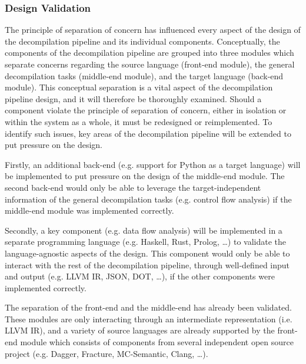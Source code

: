 
\subsubsection{Design Validation}
\label{sec:con_design_validation}

The principle of separation of concern has influenced every aspect of the design of the decompilation pipeline and its individual components. Conceptually, the components of the decompilation pipeline are grouped into three modules which separate concerns regarding the source language (front-end module), the general decompilation tasks (middle-end module), and the target language (back-end module). This conceptual separation is a vital aspect of the decompilation pipeline design, and it will therefore be thoroughly examined. Should a component violate the principle of separation of concern, either in isolation or within the system as a whole, it must be redesigned or reimplemented. To identify such issues, key areas of the decompilation pipeline will be extended to put pressure on the design.

Firstly, an additional back-end (e.g. support for Python as a target language) will be implemented to put pressure on the design of the middle-end module. The second back-end would only be able to leverage the target-independent information of the general decompilation tasks (e.g. control flow analysis) if the middle-end module was implemented correctly.

Secondly, a key component (e.g. data flow analysis) will be implemented in a separate programming language (e.g. Haskell, Rust, Prolog, …) to validate the language-agnostic aspects of the design. This component would only be able to interact with the rest of the decompilation pipeline, through well-defined input and output (e.g. LLVM IR, JSON, DOT, …), if the other components were implemented correctly.

The separation of the front-end and the middle-end has already been validated. These modules are only interacting through an intermediate representation (i.e. LLVM IR), and a variety of source languages are already supported by the front-end module which consists of components from several independent open source project (e.g. Dagger, Fracture, MC-Semantic, Clang, …).

